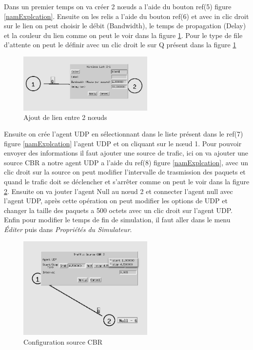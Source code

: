 \documentclass[11pt]{article}
\begin{document}
Dans un premier temps on va créer 2 nœuds a l'aide du bouton ref(5) figure \ref{namExplcation}. Ensuite on les relis a l'aide du bouton ref(6) et avec in clic droit sur le lien on peut choisir le débit (Bandwidth), le temps de propagation (Delay) et la couleur du lien comme on peut le voir dans la figure \ref{ajoutLien}. Pour le type de file d'attente on peut le définir avec un clic droit le sur Q présent dans la figure \ref{ajoutLien}

\begin{figure}[H]
	\begin{center}
		\includegraphics[width=0.6\textwidth]{assets/tp1/ajoutLienNoeud.png}
	\end{center}
	\caption{Ajout de lien entre 2 nœuds}
	\label{ajoutLien}
\end{figure}

Ensuite on crée l'agent UDP en sélectionnant dans le liste présent dans le ref(7) figure \ref{namExplcation} l'agent UDP et on cliquant sur le nœud 1. Pour pouvoir envoyer des informations il faut ajouter une source de trafic, ici on va ajouter une source CBR a notre agent UDP a l'aide du ref(8) figure \ref{namExplcation}, avec un clic droit sur la source on peut modifier l'intervalle de trasmission des paquets et quand le trafic doit se déclencher et s’arrêter comme on peut le voir dans la figure \ref{modifCBR}. Ensuite on va jouter l'agent Null au nœud 2 et connecter l'agent null avec l'agent UDP, après cette opération on peut modifier les options de UDP et changer la taille des paquets a 500 octets avec un clic droit sur l'agent UDP. Enfin pour modifier le temps de fin de simulation, il faut aller dans le menu \textit{Éditer} puis dans \textit{Propriétés du Simulateur}.

\begin{figure}[H]
	\begin{center}
		\includegraphics[width=0.6\textwidth]{assets/tp1/modifCBR.png}
	\end{center}
	\caption{Configuration source CBR}
	\label{modifCBR}
\end{figure}
\end{document}
